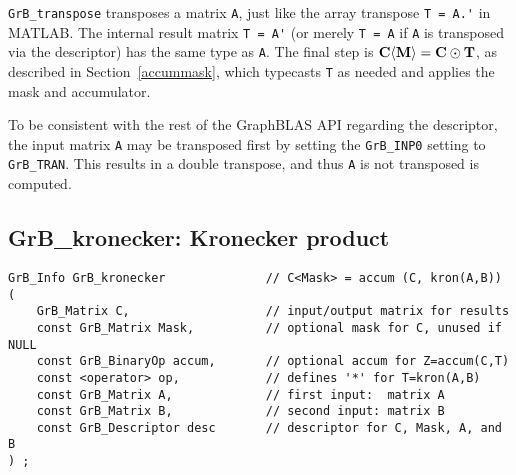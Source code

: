 \documentclass[12pt]{article}
\begin{document}
\verb'GrB_transpose'
transposes a matrix \verb'A', just like the array transpose \verb"T = A.'" in
MATLAB.  The internal result matrix \verb"T = A'" (or merely \verb"T = A" if
\verb'A' is transposed via the descriptor) has the same type as \verb'A'.  The
final step is ${\bf C \langle M \rangle  = C \odot T}$, as described in
Section~\ref{accummask}, which typecasts \verb'T' as needed and applies the
mask and accumulator.

To be consistent with the rest of the GraphBLAS API regarding the
descriptor, the input matrix \verb'A' may be transposed first by
setting the \verb'GrB_INP0' setting to \verb'GrB_TRAN'.  This results in
a double transpose, and thus \verb'A' is not transposed is computed.

\newpage
\subsection{{\sf GrB\_kronecker:} Kronecker product} %
\label{kron}

\begin{mdframed}[userdefinedwidth=6in]
{\footnotesize
\begin{verbatim}
GrB_Info GrB_kronecker              // C<Mask> = accum (C, kron(A,B))
(
    GrB_Matrix C,                   // input/output matrix for results
    const GrB_Matrix Mask,          // optional mask for C, unused if NULL
    const GrB_BinaryOp accum,       // optional accum for Z=accum(C,T)
    const <operator> op,            // defines '*' for T=kron(A,B)
    const GrB_Matrix A,             // first input:  matrix A
    const GrB_Matrix B,             // second input: matrix B
    const GrB_Descriptor desc       // descriptor for C, Mask, A, and B
) ;
\end{verbatim} } \end{mdframed}
\end{document}
